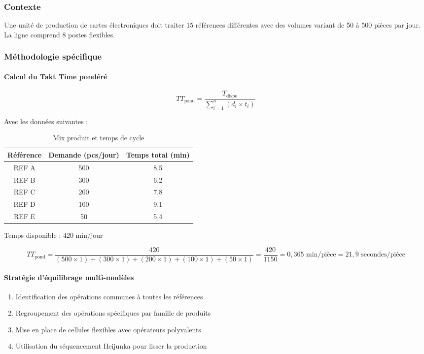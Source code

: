\documentclass[12pt,a4paper]{article}
\begin{document}
\begin{center}
\subsubsection{Contexte}
Une unité de production de cartes électroniques doit traiter 15 références différentes avec des volumes variant de 50 à 500 pièces par jour. La ligne comprend 8 postes flexibles.

\subsubsection{Méthodologie spécifique}

\paragraph{Calcul du Takt Time pondéré}
\[
TT_{\text{pond}} = \frac{T_{\text{dispo}}}{\sum_{i=1}^{n} (d_i \times t_i)}
\]

Avec les données suivantes :

\begin{table}[H]
\centering
\caption{Mix produit et temps de cycle}
\label{tab:elec_mix}
\begin{tabular}{|c|c|c|}
\hline
\textbf{Référence} & \textbf{Demande (pcs/jour)} & \textbf{Temps total (min)} \\ \hline
REF A & 500 & 8,5 \\
REF B & 300 & 6,2 \\
REF C & 200 & 7,8 \\
REF D & 100 & 9,1 \\
REF E & 50 & 5,4 \\
\hline
\end{tabular}
\end{table}

Temps disponible : 420 min/jour

\[
TT_{\text{pond}} = \frac{420}{(500 \times 1) + (300 \times 1) + (200 \times 1) + (100 \times 1) + (50 \times 1)} = \frac{420}{1150} = 0,365 \text{ min/pièce} = 21,9 \text{ secondes/pièce}
\]

\paragraph{Stratégie d'équilibrage multi-modèles}
\begin{enumerate}
    \item Identification des opérations communes à toutes les références
    \item Regroupement des opérations spécifiques par famille de produits
    \item Mise en place de cellules flexibles avec opérateurs polyvalents
    \item Utilisation du séquencement Heijunka pour lisser la production
\end{enumerate}


\end{center}
\end{document}
